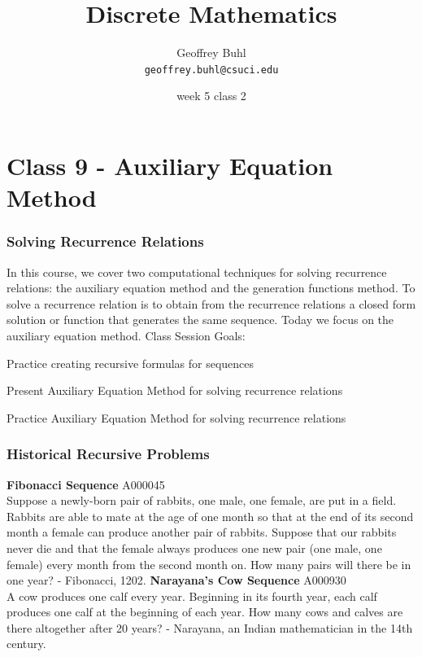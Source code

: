 \documentclass{beamer}
\title{Discrete Mathematics}
\author[Geoffrey Buhl]{Geoffrey Buhl \\ \texttt{geoffrey.buhl@csuci.edu}}
\institute[CSUCI]{California State University Channel Islands}
\date{week 5 class 2}
\newenvironment{packed_enum}{
\begin{enumerate}
  \setlength{\itemsep}{1pt}
  \setlength{\parskip}{0pt}
  \setlength{\parsep}{0pt}
}{\end{enumerate}}
\begin{document}


\section{Class 9 - Auxiliary Equation Method}

\frame
{
  \frametitle{Solving Recurrence Relations}

In this course, we cover two computational techniques for solving recurrence relations:  the auxiliary equation method and the generation functions method.  To solve a recurrence relation is to obtain from the recurrence relations a closed form solution or function that generates the same sequence.  Today we focus on the auxiliary equation method.
\vfill
Class Session Goals:
\begin{packed_enum}
\item Practice creating recursive formulas for sequences
\item Present Auxiliary Equation Method for solving recurrence relations
\item Practice Auxiliary Equation Method for solving recurrence relations
\end{packed_enum}
\vfill
}

\frame
{
  \frametitle{Historical Recursive Problems}

{\bf Fibonacci Sequence} A000045\\
Suppose a newly-born pair of rabbits, one male, one female, are put in a field. Rabbits are able to mate at the age of one month so that at the end of its second month a female can produce another pair of rabbits. Suppose that our rabbits never die and that the female always produces one new pair (one male, one female) every month from the second month on. How many pairs will there be in one year? - Fibonacci, 1202. \vfill
\vfill
{\bf Narayana's Cow Sequence} A000930\\
 A cow produces one calf every year. Beginning in its fourth year, each calf produces one calf at the beginning of each year. How many cows and calves are there altogether after 20 years? - Narayana, an Indian mathematician in the 14th century.

}
\end{document}
